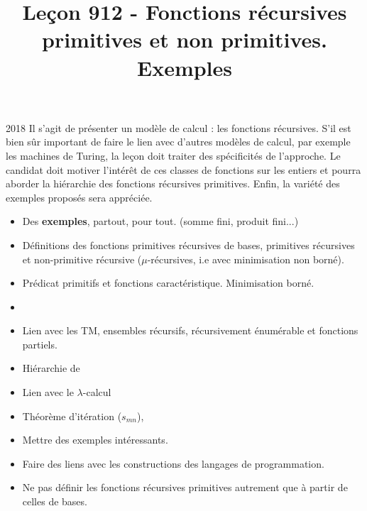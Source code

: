 \documentclass{agregfiche}
\title{Leçon 912 - Fonctions récursives primitives et non primitives. Exemples}
\begin{document}
\maketitle

\secrapports
\begin{rapport}{2018}
	Il s’agit de présenter un modèle de calcul : les fonctions récursives. S’il est bien sûr important de faire
	le lien avec d’autres modèles de calcul, par exemple les machines de Turing, la leçon doit traiter des
	spécificités de l’approche. Le candidat doit motiver l’intérêt de ces classes de fonctions sur les entiers et
	pourra aborder la hiérarchie des fonctions récursives primitives. Enfin, la variété des exemples proposés
	sera appréciée.
\end{rapport}

\secindispensables

\begin{itemize}
	\item Des \textbf{exemples}, partout, pour tout. (somme fini, produit fini...) 
	\item Définitions des fonctions primitives récursives de bases, primitives récursives et non-primitive récursive ($\mu$-récursives, i.e avec minimisation non borné).
	\item Prédicat primitifs et fonctions caractéristique. Minimisation borné.
  
\end{itemize}

\secasavoir

\begin{itemize}
	\item {}
	\item Lien avec les TM, ensembles récursifs, récursivement énumérable et fonctions partiels.
\end{itemize}


\secidees

\begin{itemize}

	\item Hiérarchie de 
	\item Lien avec le $\lambda$-calcul
	\item Théorème d'itération ($s_{mn}$),
\end{itemize}

\secpieges

\begin{itemize}
	\item Mettre des exemples intéressants.
    \item Faire des liens avec les constructions des langages de programmation.
	\item Ne pas définir les fonctions récursives primitives autrement que à partir de celles de bases.
\end{itemize}
\end{document}
